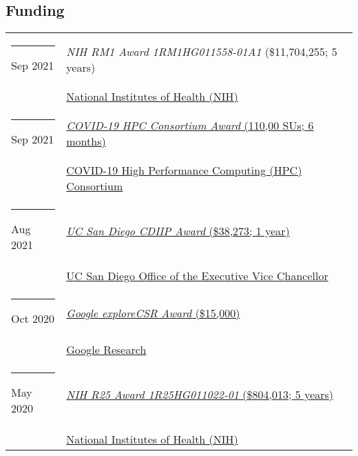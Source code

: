 \documentclass[margin,line]{res}
\begin{document}
\begin{resume}
\section{\sc Funding}
\begin{longtable}{@{}p{0.7in}p{4in}}
\hspace*{-4mm} \rule{-1mm}{5mm} Sep 2021 & \textit{NIH RM1 Award 1RM1HG011558-01A1} (\$11,704,255; 5 years)\\*
\hspace*{-4mm} \hspace*{-4mm} & \hspace{4mm} \href{https://nih.gov}{National Institutes of Health (NIH)}\\
\hspace*{-4mm} \rule{-1mm}{5mm} Sep 2021 & \href{https://www.xsede.org/covid19-hpc-consortium}{\textit{COVID-19 HPC Consortium Award} (110,00 SUs; 6 months)}\\*
\hspace*{-4mm} \hspace*{-4mm} & \hspace{4mm} \href{https://covid19-hpc-consortium.org/}{COVID-19 High Performance Computing (HPC) Consortium}\\
\hspace*{-4mm} \rule{-1mm}{5mm} Aug 2021 & \href{https://academicaffairs.ucsd.edu/evc/cdiip.html}{\textit{UC San Diego CDIIP Award} (\$38,273; 1 year)}\\*
\hspace*{-4mm} \hspace*{-4mm} & \hspace{4mm} \href{https://academicaffairs.ucsd.edu/evc/cdiip.html}{UC San Diego Office of the Executive Vice Chancellor}\\
\hspace*{-4mm} \rule{-1mm}{5mm} Oct 2020 & \href{https://research.google/outreach/explore-csr/recipients/?category=2020}{\textit{Google exploreCSR Award} (\$15,000)}\\*
\hspace*{-4mm} \hspace*{-4mm} & \hspace{4mm} \href{https://research.google/}{Google Research}\\
\hspace*{-4mm} \rule{-1mm}{5mm} May 2020 & \href{https://reporter.nih.gov/project-details/9935824}{\textit{NIH R25 Award 1R25HG011022-01} (\$804,013; 5 years)}\\*
\hspace*{-4mm} \hspace*{-4mm} & \hspace{4mm} \href{https://nih.gov}{National Institutes of Health (NIH)}\\

\end{longtable}
\end{resume}
\end{document}
